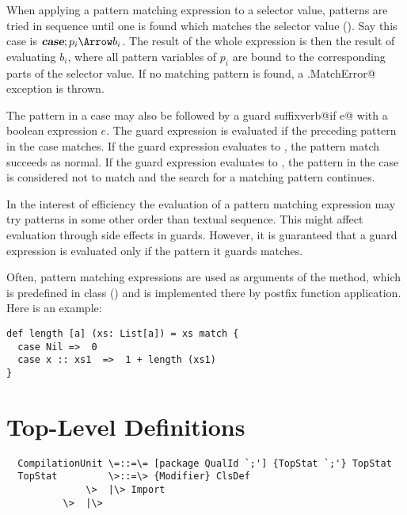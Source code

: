 \documentclass[11pt]{report}
\begin{document}
When applying a pattern matching expression to a selector value,
patterns are tried in sequence until one is found which matches the
selector value (). Say this case is $\CASE;p_i
\Arrow b_i$.  The result of the whole expression is then the result of
evaluating $b_i$, where all pattern variables of $p_i$ are bound to
the corresponding parts of the selector value.  If no matching pattern
is found, a \verb@scala.MatchError@ exception is thrown.

The pattern in a case may also be followed by a guard suffixverb@if e@
with a boolean expression $e$.  The guard expression is evaluated if
the preceding pattern in the case matches. If the guard expression
evaluates to \verb@true@, the pattern match succeeds as normal. If the
guard expression evaluates to \verb@false@, the pattern in the case
is considered not to match and the search for a matching pattern
continues.


In the interest of efficiency the evaluation of a pattern matching
expression may try patterns in some other order than textual
sequence. This might affect evaluation through
side effects in guards. However, it is guaranteed that a guard
expression is evaluated only if the pattern it guards matches.

\example
Often, pattern matching expressions are used as arguments
of the \verb@match@ method, which is predefined in class \verb@Any@
() and is implemented there by postfix function
application. Here is an example:
\begin{verbatim}
def length [a] (xs: List[a]) = xs match {
  case Nil =>  0
  case x :: xs1  =>  1 + length (xs1)
}
\end{verbatim}

\chapter{Top-Level Definitions}
\label{sec:topdefs}

\syntax\begin{verbatim}
  CompilationUnit \=::=\= [package QualId `;'] {TopStat `;'} TopStat
  TopStat         \>::=\> {Modifier} ClsDef
	          \>  |\> Import
		  \>  |\>
\end{verbatim}
\end{document}

